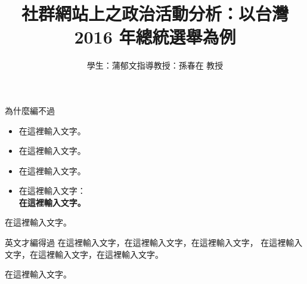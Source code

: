 \documentclass[final,hyperref={pdfpagelabels=false}]{beamer}
\institute[nctucs]{國立交通大學資訊工程學系}
\title{社群網站上之政治活動分析：以台灣 2016 年總統選舉為例}
\author[ywpu]{學生：蒲郁文\hspace*{1 in}指導教授：孫春在 教授}
\begin{document}
\begin{CJK}{UTF8}{bsmi}
\begin{frame}
\centering

\begin{block}{為什麼編不過}
\begin{minipage}{0.64\paperwidth}
  \begin{itemize}
    \item 在這裡輸入文字。
    \item 在這裡輸入文字。
    \item 在這裡輸入文字。
    \item 在這裡輸入文字：\\\textbf{在這裡輸入文字。}
  \end{itemize}
\end{minipage}
\qquad
\begin{minipage}{0.29\paperwidth}
  \begin{center}
    在這裡輸入文字。
  \end{center}
\end{minipage}
\end{block}

\begin{block}{英文才編得過}
  在這裡輸入文字，在這裡輸入文字，在這裡輸入文字，%
  在這裡輸入文字，在這裡輸入文字，在這裡輸入文字。%
  \vspace*{10mm}
  \begin{center}
    在這裡輸入文字。
  \end{center}
\end{block}


\end{frame}
\end{CJK}
\end{document}

